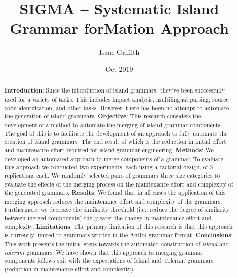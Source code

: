 \documentclass[10pt,nocc]{xrese_report}
\begin{document}
\frontmatter
{}



\title{SIGMA -- Systematic Island Grammar forMation Approach}

\date{Oct 2019}

\author{Isaac Griffith}




\maketitle
\tableofcontents
\listoffiguresandtables
\listofalgorithms

\mainmatter

\begin{abstract}
\textbf{Introduction}: Since the introduction of island grammars, they've been successfully used for a variety of tasks. This includes impact analysis, multilingual parsing, source code identification, and other tasks. However, there has been no attempt to automate the generation of island grammars.
\textbf{Objective}: This research considers the development of a method to automate the merging of island grammar components. The goal of this is to facilitate the development of an approach to fully automate the creation of island grammars. The end result of which is the reduction in initial effort and maintenance effort required for island grammar engineering. 
\textbf{Methods}: We developed an automated approach to merge components of a grammar. To evaluate this approach we conducted two experiments, each using a factorial design, of 5 replications each. We randomly selected pairs of grammars three size categories to evaluate the effects of the merging process on the maintenance effort and complexity of the generated grammars. 
\textbf{Results}: We found that in all cases the application of this merging approach reduces the maintenance effort and complexity of the grammars. Furthermore, we decrease the similarity threshold (i.e., reduce the degree of similarity between merged components) the greater the change in maintenance effort and complexity. 
\textbf{Limitations}: The primary limitation of this research is that this approach is currently limited to grammars written in the Antlr4 grammar format. 
\textbf{Conclusions}: This work presents the initial steps towards the automated construction of \textit{island} and \textit{tolerant} grammars. We have shown that this approach to merging grammar components follows suit with the expectations of Island and Tolerant grammars (reduction in maintenance effort and complexity).
\end{abstract}
\end{document}

